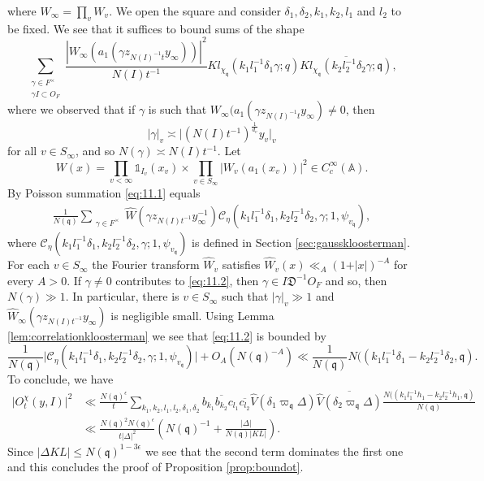 \documentclass[a4paper,11pt]{amsart}
\theoremstyle{definition}
\newcommand{\A}{\mathbb{A}}
\begin{document}
where $W_{\infty} = \prod_v W_v$.
We open the square and consider $\delta_1,\delta_2,k_1,k_2,l_1$ and $l_2$ to be fixed. We see that it suffices to bound sums of the shape 
\begin{equation}\label{eq:11.1}
    \sum_{\substack{\gamma \in F^{\times}\\ \gamma I \subset O_F}}\frac{\left\vert W_{\infty}\left(a_1(\gamma z_{N(I)^{-1}t}y_{\infty})\right)\right\vert^2}{N(I)t^{-1}}Kl_{\chi_{\mathfrak{q}}}(k_1l_1^{-1}\delta_1\gamma;q)\overline{Kl_{\chi_{\mathfrak{q}}}(k_2l_2^{-1}\delta_2\gamma;\mathfrak{q})},
\end{equation}
where we observed that if $\gamma$ is such that $W_{\infty}(a_1(\gamma z_{N(I)^{-1}t}y_{\infty}) \neq 0$, then $$\vert{\gamma}\vert_v \asymp \vert (N(I)t^{-1})^{\frac{1}{d_v}}y_v \vert_v$$ for all $v\in S_{\infty}$, and so $N(\gamma) \asymp  N(I)t^{-1}$.
Let $$W(x) = \prod_{v<\infty}\mathbb{1}_{I_v}(x_v) \times \prod_{v\in S_{\infty}}\vert{W_v}(a_1(x_v))\vert^2 \in C_c^{\infty}(\A).$$ By Poisson summation \eqref{eq:11.1} equals  \begin{align}\label{eq:11.2}
    \frac{1}{N(\mathfrak{q})}\sum_{\substack{\gamma \in F^{\times}}}\widehat{W}(\gamma z_{N(I)t^{-1}}y_{\infty}^{-1}) \mathcal{C}_{\eta}(k_1l_1^{-1}\delta_1,k_2l_2^{-1}\delta_2,\gamma;1,\psi_{v_{\mathfrak{q}}}),
\end{align}
where $\mathcal{C}_{\eta}(k_1l_1^{-1}\delta_1,k_2l_2^{-1}\delta_2,\gamma;1,\psi_{v_{\mathfrak{q}}})$ is defined in Section \ref{sec:gausskloosterman}. For each $v\in S_{\infty}$ the Fourier transform $\widehat{W}_v$ satisfies $\widehat{W}_v(x) \ll_A (1+\vert{x}\vert)^{-A}$ for every $A>0$. If $\gamma\neq 0$ contributes to \eqref{eq:11.2}, then $\gamma \in I\mathfrak{D}^{-1}O_F$ and so, then $N(\gamma)\gg 1$. In particular, there is $v\in S_{\infty}$ such that $\vert\gamma\vert_v \gg 1$ and $\widehat{W}_{\infty}(\gamma z_{N(I)t^{-1}}y_{\infty})$ is negligible small. Using Lemma \ref{lem:correlationkloosterman} we see that \eqref{eq:11.2} is bounded by 
\[\frac{1}{N(\mathfrak{q})}\vert \mathcal{C}_{\eta}(k_1l_1^{-1}\delta_1,k_2l_2^{-1}\delta_2,\gamma;1,\psi_{v_{\mathfrak{q}}}) \vert + O_A(N(\mathfrak{q})^{-A}) \ll \frac{1}{N(\mathfrak{q})}N((k_1l_1^{-1}\delta_1-k_2l_2^{-1}\delta_2,\mathfrak{q}).  \]
 To conclude, we have 
\begin{align*}\vert O_t^{\chi}(y,I)\vert ^2 &\ll \frac {N(\mathfrak{q})^{\epsilon}}{t}\sum_{k_1,k_2,l_1,l_2,\delta_1,\delta_2} b_{k_1}\overline{b_{k_2}}c_{l_1}\overline{c_{l_2}}\widehat{V}\left(\delta_1\varpi_\mathfrak{q} \Delta\right)\overline{\widehat{V}\left(\delta_2\varpi_\mathfrak{q} \Delta\right)}\frac{N((k_1l_1^{-1}h_1-k_2l_2^{-1}h_1,\mathfrak{q})}{N(\mathfrak{q})
} \\&\ll \frac {N(\mathfrak{q})^2N(\mathfrak{q})^{\epsilon}}{t\vert\Delta\vert^2}(N(\mathfrak{q})^{-1}+\frac{\vert\Delta\vert}{N(\mathfrak{q})\vert KL\vert} ).\end{align*}
Since $\vert{\Delta}KL\vert \leq N(\mathfrak{q})^{1-3\epsilon}$ we see that the second term dominates the first one and this concludes the proof of Proposition \ref{prop:boundot}.
\end{document}
